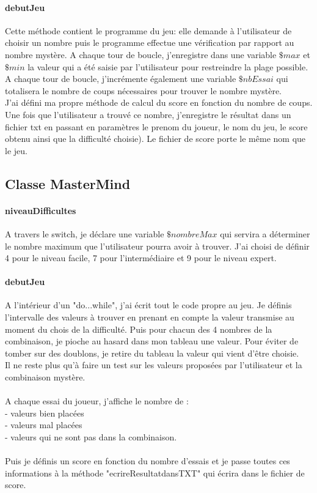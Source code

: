 \documentclass[10pt]{report}
\begin{document}
			\paragraph{debutJeu\\}
			Cette méthode contient le programme du jeu: elle demande à l'utilisateur de choisir un nombre puis le programme effectue une vérification par rapport au nombre mystère. A chaque tour de boucle, j'enregistre dans une variable $\$max$ et $\$min$ la valeur qui a été saisie par l'utilisateur pour restreindre la plage possible.\\
			A chaque tour de boucle, j'incrémente également une variable $\$nbEssai$ qui totalisera le nombre de coups nécessaires pour trouver le nombre mystère.\\
			J'ai défini ma propre méthode de calcul du score en fonction du nombre de coups.\\
			Une fois que l'utilisateur a trouvé ce nombre, j'enregistre le résultat dans un fichier txt en passant en paramètres le prenom du joueur, le nom du jeu, le score obtenu ainsi que la difficulté choisie). Le fichier de score porte le même nom que le jeu.

		\subsection{Classe MasterMind}
			\paragraph{niveauDifficultes\\}
			A travers le switch, je déclare une variable $\$nombreMax$ qui servira a déterminer le nombre maximum que l'utilisateur pourra avoir à trouver. J'ai choisi de définir 4 pour le niveau facile, 7 pour l'intermédiaire et 9 pour le niveau expert.

			\paragraph{debutJeu\\}
			A l'intérieur d'un "do...while", j'ai écrit tout le code propre au jeu. Je définis l'intervalle des valeurs à trouver en prenant en compte la valeur transmise au moment du chois de la difficulté. Puis pour chacun des 4 nombres de la combinaison, je pioche au hasard dans mon tableau une valeur. Pour éviter de tomber sur des doublons, je retire du tableau la valeur qui vient d'être choisie.\\
			Il ne reste plus qu'à faire un test sur les valeurs proposées par l'utilisateur et la combinaison mystère.\\\\
			A chaque essai du joueur, j'affiche le nombre de :\\
			- valeurs bien placées\\
			- valeurs mal placées\\
			- valeurs qui ne sont pas dans la combinaison.\\\\
			Puis je définis un score en fonction du nombre d'essais et je passe toutes ces informations à la méthode "ecrireResultatdansTXT" qui écrira dans le fichier de score.
\end{document}
